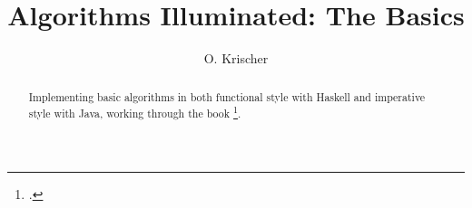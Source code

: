 \documentclass{scrartcl}
\numberwithin{equation}{section}
\begin{document}


\title{Algorithms Illuminated: The Basics}
\author{O. Krischer}
\maketitle
\begin{abstract}
   Implementing basic algorithms in both functional style with Haskell and imperative style with Java, working through the book  \footcite{rough18}.
\end{abstract}
\tableofcontents



\printbibliography
\end{document}
